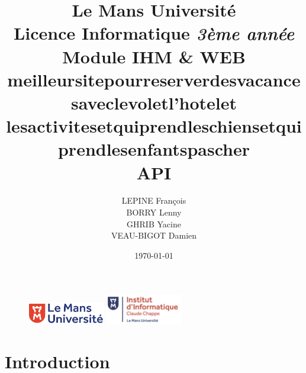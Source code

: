 \documentclass[a4paper,11pt]{article}
\begin{document}
\begin{figure}
\includegraphics[width=0.3\textwidth]{logolemansU.png}
\hspace{150pt} 
\includegraphics[width=0.3\textwidth]{logo_ic2.png} 
\end{figure}

\title{\textbf{\color{blue} Le Mans Université}\color{black}
\\ Licence Informatique \textit{3ème année}
\\ Module IHM \& WEB
\\ meilleursitepourreserverdesvacancesaveclevoletl'hotelet\\lesactivitesetquiprendleschiensetquiprendlesenfantspascher
\\ \textbf{API}}
\author{LEPINE François\\BORRY Lenny\\GHRIB Yacine\\VEAU-BIGOT Damien}
\date{\today} 
\maketitle 
\newpage

\tableofcontents
\newpage


\section{Introduction}
\end{document}
